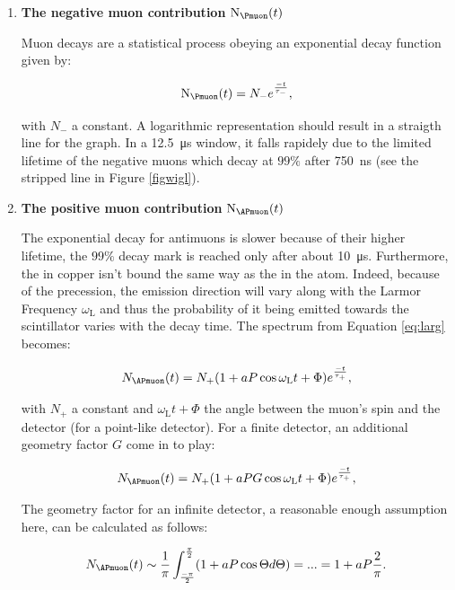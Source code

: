 \begin{enumerate}

\item \textbf{The negative muon contribution} $\text{N}_{\Pmuon}(t)$

Muon decays are a statistical process obeying an exponential decay function given by:

\begin{equation}
\text{N}_{\Pmuon}(t)=N_{-}e^{\frac{-t}{\tau_{-}}},
\end{equation}

with $N_{-}$ a constant. A logarithmic representation should result in a straigth line for the graph. In a \SI{12.5}{\micro\second} window, it falls rapidely due to the limited lifetime of the negative muons which decay at $99\%$ after \SI{750}{\nano\second} (see the stripped line in Figure \ref{figwigl}).

\item \textbf{The positive muon contribution} $\text{N}_{\APmuon}(t)$

The exponential decay for antimuons is slower because of their higher lifetime, the $99\%$ decay mark is reached only after about \SI{10}{\micro\second}. Furthermore, the \APmuon in copper isn't bound the same way as the \Pmuon in the atom. Indeed, because of the precession, the emission direction will vary along with the Larmor Frequency $\omega_{\text{L}}$ and thus the probability of it being emitted towards the scintillator varies with the decay time. The spectrum from Equation \ref{eq:larg} becomes:

\begin{equation}
N_{\APmuon}(t)=N_{+}(1+aP\cos{\omega_{\text{L}}t+\Phi})e^{\frac{-t}{\tau_{+}}},
\end{equation}

with $N_{+}$ a constant and $\omega_{\text{L}}t+\Phi$ the angle between the muon's spin and the detector (for a point-like detector). For a finite detector, an additional geometry factor $G$ come in to play:

\begin{equation}
N_{\APmuon}(t)=N_{+}(1+aPG\cos{\omega_{\text{L}}t+\Phi})e^{\frac{-t}{\tau_{+}}},
\end{equation}

The geometry factor for an infinite detector, a reasonable enough assumption here, can be calculated as follows:

\begin{equation}
N_{\APmuon}(t)\sim \frac{1}{\pi} \int_{\frac{-\pi}{2}}^{\frac{\pi}{2}} (1+aP\cos{\Theta}d\Theta)=...=1+aP\frac{2}{\pi}.
\end{equation}


\end{enumerate}
